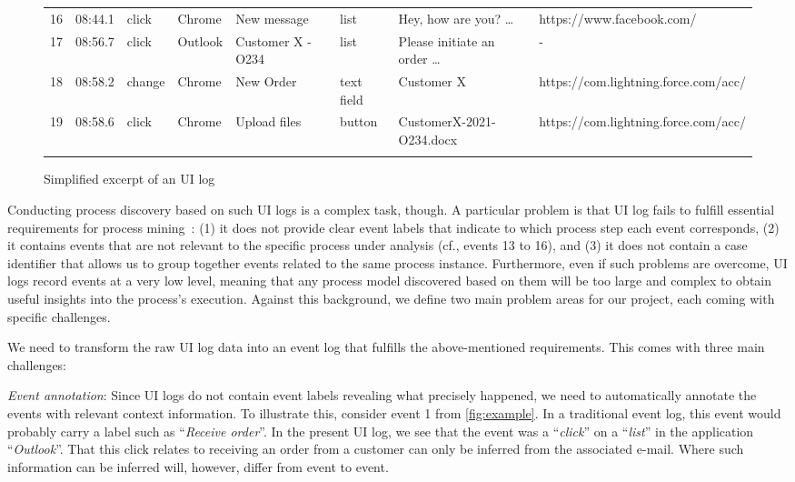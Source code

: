 \begin{figure}[h!]
\begin{adjustbox}{max width=\textwidth}
\begin{tabular}{llllllll}
16&08:44.1&click&Chrome&New message&list&Hey, how are you? …&https://www.facebook.com/\\\noalign{\smallskip}
17&08:56.7&click&Outlook&Customer X - O234&list&Please initiate an order …&-\\\noalign{\smallskip}
18&08:58.2&change&Chrome&New Order&text field&Customer X&https://com.lightning.force.com/acc/\\\noalign{\smallskip}
19&08:58.6&click&Chrome&Upload files&button&CustomerX-2021-O234.docx&https://com.lightning.force.com/acc/\\\noalign{\smallskip}
\hline\noalign{\smallskip}
\end{tabular}
\end{adjustbox}
\caption{Simplified excerpt of an UI log}
\label{fig:example}
\end{figure}

Conducting process discovery based on such UI logs is a complex task, though.
A particular problem is that UI log fails to fulfill essential requirements for process mining~\cite{van2016data}: (1) it does not provide clear event labels that indicate to which process step each event corresponds, (2) it contains events that are not relevant to the specific process under analysis 
(cf., events 13 to 16), and (3) it does not contain a case identifier that allows us to 
group together events related to the same process instance. Furthermore, even if such problems are overcome, UI logs record events at a very low level, meaning that any process model discovered based on them will be too large and complex to obtain useful insights into the process's execution. Against this background, we define two main problem areas for our project, each coming with specific challenges. 

 We need to transform the raw UI log data into an event log that fulfills the above-mentioned requirements. This comes with three main challenges:

\noindent \textit{Event annotation}: Since UI logs do not contain event labels revealing what precisely happened, we need to automatically annotate the events with relevant context information. To illustrate this, consider event 1 from \autoref{fig:example}. In a traditional event log, this event would probably carry a label such as ``\textit{Receive order}''. In the present UI log, we see that the event was a ``\textit{click}'' on a ``\textit{list}'' in the application ``\textit{Outlook}''. That this click relates to receiving an order from a customer can only be inferred from the associated e-mail. Where such information can be inferred will, however, differ from event to event. 

